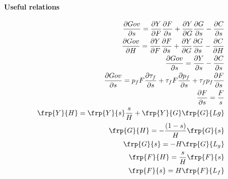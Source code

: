 \paragraph{Useful relations}
\begin{align}
\frac{\partial Gov}{\partial s}=\frac{\partial Y}{\partial F}\frac{\partial F}{\partial s}+\frac{\partial Y}{\partial G}\frac{\partial G}{\partial s}-\frac{\partial C}{\partial s}\\
\frac{\partial Gov}{\partial H}=\frac{\partial Y}{\partial F}\frac{\partial F}{\partial s}+\frac{\partial Y}{\partial G}\frac{\partial G}{\partial s}-\frac{\partial C}{\partial H}\\
\frac{\partial Gov}{\partial s}=\frac{\partial Y}{\partial s}-\frac{\partial C}{\partial s}\\
\frac{\partial Gov}{\partial s}=p_f F \frac{\partial \tau_f}{\partial s}+\tau_f F \frac{\partial p_f}{\partial s}+\tau_f p_f \frac{\partial F}{\partial s}\\
\frac{\partial F}{\partial s}=\frac{F}{s}
\\
\frp{Y}{H}= \frp{Y}{s}\frac{s}{H}+\frp{Y}{G}\frp{G}{Lg}
\\
\frp{G}{H}=-\frac{(1-s)}{H}\frp{G}{s}
\\\frp{G}{s}=-H\frp{G}{L_g}\\
\frp{F}{H}=\frac{s}{H}\frp{F}{s}\\
\frp{F}{s}=H\frp{F}{L_f}
\end{align}


